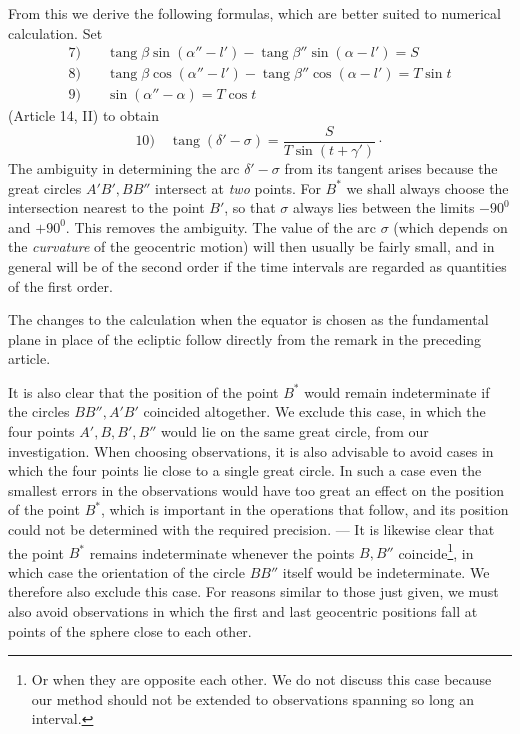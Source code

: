 From this we derive the following formulas, which are better suited to numerical calculation.
Set
\[
\begin{aligned}
7)\quad&\operatorname{tang}\beta\sin(\alpha''-l')-\operatorname{tang}\beta''\sin(\alpha-l')=S\\[.5ex]
8)\quad&\operatorname{tang}\beta\cos(\alpha''-l')-\operatorname{tang}\beta''\cos(\alpha-l')=T\sin t\\[.5ex]
9)\quad&\sin(\alpha''-\alpha)=T\cos t
\end{aligned}
\]
(Article 14, II) to obtain
\[
10)\quad\operatorname{tang}(\delta'-\sigma)=\frac{S}{T\sin(t+\gamma')}\mathpunct{\cdot}
\]
The ambiguity in determining the arc $\delta'-\sigma$ from its tangent arises because the great circles
$A'B',BB''$ intersect at \emph{two} points. For $B^*$ we shall always \hypertarget{native-186}{}choose the intersection
nearest to the point $B'$, so that $\sigma$ always lies between the limits $-90^0$ and $+90^0$.
This removes the ambiguity. The value of the arc $\sigma$ (which depends on the \emph{curvature}
of the geocentric motion) will then usually be fairly small, and in general will be of the
second order if the time intervals are regarded as quantities of the first order.

The changes to the calculation when the equator is chosen as the fundamental plane in place of
the ecliptic follow directly from the remark in the preceding article.

It is also clear that the position of the point $B^*$ would remain indeterminate if the circles
$BB'',A'B'$ coincided altogether. We exclude this case, in which the four points $A',B,B',B''$ would lie on
the same great circle, from our investigation. When choosing observations, it is also advisable
to avoid cases in which the four points lie close to a single great circle. In such a case even
the smallest errors in the observations would have too great an effect on the position of the
point $B^*$, which is important in the operations that follow, and its position could not be
determined with the required precision. --- It is likewise clear that the point $B^*$ remains
indeterminate whenever the points $B,B''$ coincide\footnote{Or when they are opposite each other.
We do not discuss this case because our method should not be extended to observations spanning
so long an interval.}, in which case the orientation of the circle $BB''$ itself would be
indeterminate. We therefore also exclude this case. For reasons similar to those just given, we
must also avoid observations in which the first and last geocentric positions fall at points of
the sphere close to each other.
